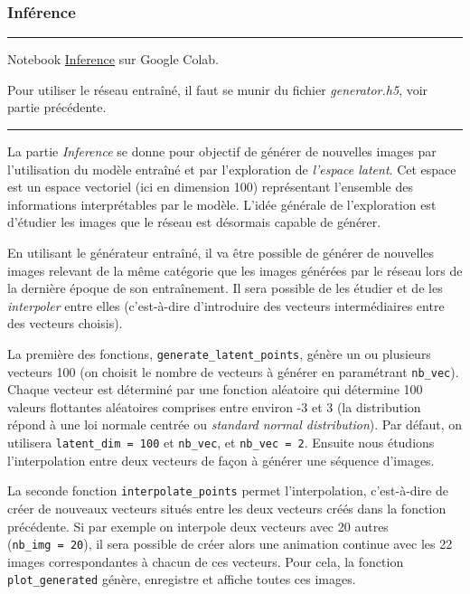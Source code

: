 \documentclass[
]{article}
\begin{document}
\hypertarget{infuxe9rence}{%
\subsubsection{Inférence}\label{infuxe9rence}}

\begin{center}\rule{0.5\linewidth}{0.5pt}\end{center}

Notebook \href{https://colab.research.google.com/drive/13g3rX2zgyxT5YKTZILBrISybmLJ4_pXi}{Inference} sur Google Colab.

Pour utiliser le réseau entraîné, il faut se munir du fichier \emph{generator.h5}, voir partie précédente.

\begin{center}\rule{0.5\linewidth}{0.5pt}\end{center}

La partie \emph{Inference} se donne pour objectif de générer de nouvelles images par l'utilisation du modèle entraîné et par l'exploration de \emph{l'espace latent}. Cet espace est un espace vectoriel (ici en dimension 100) représentant l'ensemble des informations interprétables par le modèle. L'idée générale de l'exploration est d'étudier les images que le réseau est désormais capable de générer.

En utilisant le générateur entraîné, il va être possible de générer de nouvelles images relevant de la même catégorie que les images générées par le réseau lors de la dernière époque de son entraînement. Il sera possible de les étudier et de les \emph{interpoler} entre elles (c'est-à-dire d'introduire des vecteurs intermédiaires entre des vecteurs choisis).

La première des fonctions, \texttt{generate\_latent\_points}, génère un ou plusieurs vecteurs 100 (on choisit le nombre de vecteurs à générer en paramétrant \texttt{nb\_vec}). Chaque vecteur est déterminé par une fonction aléatoire qui détermine 100 valeurs flottantes aléatoires comprises entre environ -3 et 3 (la distribution répond à une loi normale centrée ou \emph{standard normal distribution}). Par défaut, on utilisera \texttt{latent\_dim\ =\ 100} et \texttt{nb\_vec}, et \texttt{nb\_vec\ =\ 2}. Ensuite nous étudions l'interpolation entre deux vecteurs de façon à générer une séquence d'images.

La seconde fonction \texttt{interpolate\_points} permet l'interpolation, c'est-à-dire de créer de nouveaux vecteurs situés entre les deux vecteurs créés dans la fonction précédente. Si par exemple on interpole deux vecteurs avec 20 autres (\texttt{nb\_img\ =\ 20}), il sera possible de créer alors une animation continue avec les 22 images correspondantes à chacun de ces vecteurs. Pour cela, la fonction \texttt{plot\_generated} génère, enregistre et affiche toutes ces images.
\end{document}
